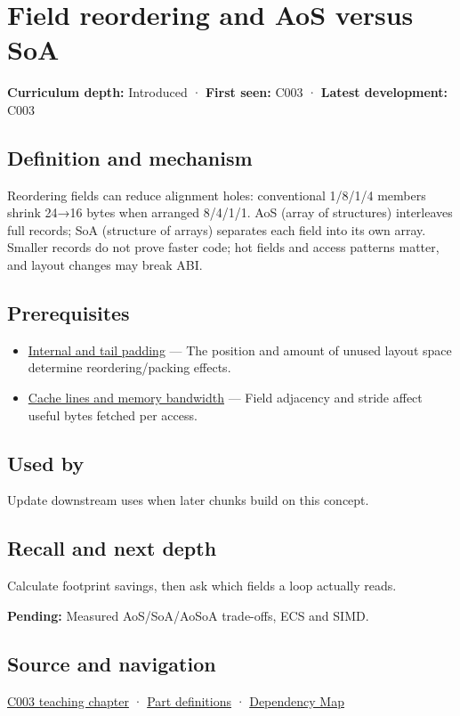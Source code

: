 \hypertarget{appendix-5522ad176ca0}{}\label{referencestart:appendix-5522ad176ca0}
\section{Field reordering and AoS versus SoA}\label{appendix-5522ad176ca0-field-reordering-and-aos-versus-soa}

\textbf{Curriculum depth:} Introduced · \textbf{First seen:} C003 · \textbf{Latest development:} C003

\subsection{Definition and mechanism}\label{appendix-5522ad176ca0-definition-and-mechanism}

Reordering fields can reduce alignment holes: conventional 1/8/1/4 members shrink 24→16 bytes when arranged 8/4/1/1. AoS (array of structures) interleaves full records; SoA (structure of arrays) separates each field into its own array. Smaller records do not prove faster code; hot fields and access patterns matter, and layout changes may break ABI.

\subsection{Prerequisites}\label{appendix-5522ad176ca0-prerequisites}

\begin{itemize}
\tightlist
\item
  \hyperref[appendix-f52f8c5a3afd]{Internal and tail padding} --- The position and amount of unused layout space determine reordering/packing effects.
\item
  \hyperref[appendix-e4ccdbab8320]{Cache lines and memory bandwidth} --- Field adjacency and stride affect useful bytes fetched per access.
\end{itemize}

\subsection{Used by}\label{appendix-5522ad176ca0-used-by}

Update downstream uses when later chunks build on this concept.

\subsection{Recall and next depth}\label{appendix-5522ad176ca0-recall-and-next-depth}

Calculate footprint savings, then ask which fields a loop actually reads.

\textbf{Pending:} Measured AoS/SoA/AoSoA trade-offs, ECS and SIMD.

\subsection{Source and navigation}\label{appendix-5522ad176ca0-source-and-navigation}

\hyperref[01-foundations-i-ch002-where-the-bytes-live]{C003 teaching chapter} · \hyperref[appendix-fd090d982a15-m003---parts-41-60]{Part definitions} · \hyperref[appendix-4ad47bdd269a]{Dependency Map}

